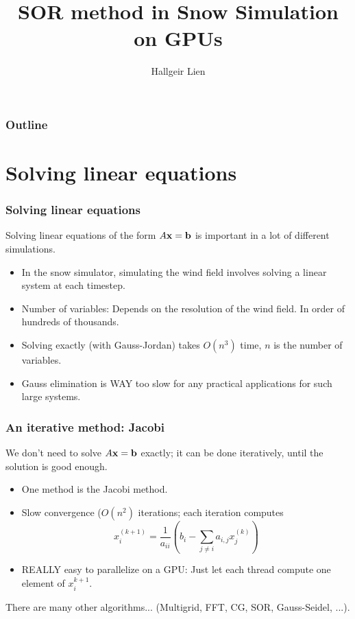 \usepackage{style}
\usepackage{url}

\title[SOR in Snow Simulation]{SOR method in Snow Simulation on GPUs}
\author{Hallgeir Lien}


\maketitle

\AtBeginSection{
    \begin{frame}
    \tableofcontents[currentsection]
    \end{frame}
}

\begin{frame}
\frametitle{Outline}
\tableofcontents
\end{frame}



\section{Solving linear equations}
\begin{frame}
\frametitle{Solving linear equations}
Solving linear equations of the form $A\bf{x} = \bf{b}$ is important in a lot of different simulations.

\begin{itemize}
\item In the snow simulator, simulating the wind field involves solving a linear system at each timestep.
\item Number of variables: Depends on the resolution of the wind field. In order of hundreds of thousands.
\item Solving exactly (with Gauss-Jordan) takes $O(n^3)$ time, $n$ is the number of variables.
\item Gauss elimination is WAY too slow for any practical applications for such large systems.
\end{itemize}

\end{frame}

\begin{frame}
\frametitle{An iterative method: Jacobi}
We don't need to solve $A\bf{x} = \bf{b}$ exactly; it can be done iteratively, until the solution is good enough.
\begin{itemize}
\item One method is the Jacobi method.
\item Slow convergence ($O(n^2)$ iterations; each iteration computes
$$
x_i^{(k+1)} = \frac{1}{a_{ii}}\left(b_i-\sum_{j\neq i} a_{i,j}x_j^{(k)}\right)
$$
\item REALLY easy to parallelize on a GPU: Just let each thread compute one element of $x_i^{k+1}$.
\end{itemize}

There are many other algorithms... (Multigrid, FFT, CG, SOR, Gauss-Seidel, ...).
\end{frame}

